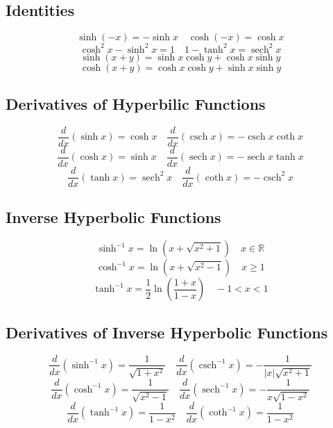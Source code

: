 \documentclass[10pt,a4paper,oneside]{article}
\begin{document}
\subsection{Identities}
\[
\sinh(-x)=-\sinh x\quad \cosh(-x)=\cosh x
\]
\[
\cosh^2x-\sinh^2x=1\quad1-\tanh^2x=\operatorname{sech}^2x
\]
\[
\sinh(x+y)=\sinh x\cosh y+\cosh x\sinh y
\]
\[
\cosh(x+y)=\cosh x \cosh y+\sinh x\sinh y
\]
\subsection{Derivatives of Hyperbilic Functions}
\[
\frac{d}{dx}(\sinh x)=\cosh x\quad \frac{d}{dx}(\operatorname{csch}x)=-\operatorname{csch}x\coth x
\]
\[
\frac{d}{dx}(\cosh x)=\sinh x\quad \frac{d}{dx}(\operatorname{sech}x)=-\operatorname{sech}x\tanh x
\]
\[
\frac{d}{dx}(\tanh x)=\operatorname{sech}^2 x\quad \frac{d}{dx}(\operatorname{coth}x)=-\operatorname{csch}^2x
\]
\subsection{Inverse Hyperbolic Functions}
\[
\sinh^{-1}x=\ln(x+\sqrt{x^2+1})\quad x\in\mathbb{R}
\]
\[
\cosh^{-1}x=\ln(x+\sqrt{x^2-1})\quad x\geqslant1
\]
\[
\tanh^{-1}x=\frac{1}{2}\ln\left(\frac{1+x}{1-x}\right)\quad-1<x<1
\]
\subsection{Derivatives of Inverse Hyperbolic Functions}
\[
\frac{d}{dx}(\sinh^{-1}x)=\frac{1}{\sqrt{1+x^2}}\quad\frac{d}{dx}(\operatorname{csch}^{-1}x)=-\frac{1}{|x|\sqrt{x^2+1}}
\]
\[
\frac{d}{dx}(\cosh^{-1}x)=\frac{1}{\sqrt{x^2-1}}\quad\frac{d}{dx}(\operatorname{sech}^{-1}x)=-\frac{1}{x\sqrt{1-x^2}}
\]
\[
\frac{d}{dx}(\tanh^{-1}x)=\frac{1}{1-x^2}\quad\frac{d}{dx}(\operatorname{coth}^{-1}x)=\frac{1}{1-x^2}
\]
\end{document}
